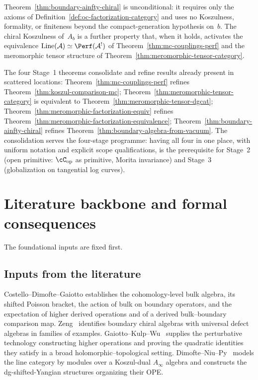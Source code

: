 \begin{remark}
\label{rem:boundary-ainfty-unconditional}
Theorem~\ref{thm:boundary-ainfty-chiral} is unconditional:
it requires only the axioms of
Definition~\ref{def:oc-factorization-category} and uses no
Koszulness, formality, or finiteness beyond the compact-generation
hypothesis on~$b$. The chiral Koszulness of~$A_b$ is a further
property that, when it holds, activates the equivalence
$\operatorname{Line}(\cA) \simeq \Perf(\cA^!)$ of
Theorem~\ref{thm:mc-couplings-perf} and the meromorphic tensor
structure of Theorem~\ref{thm:meromorphic-tensor-category}.
\end{remark}

\begin{remark}
\label{rem:stage1-cross-references}
The four Stage~1 theorems consolidate and refine results
already present in scattered locations:
Theorem~\ref{thm:mc-couplings-perf} refines
Theorem~\ref{thm:koszul-comparison-mc};
Theorem~\ref{thm:meromorphic-tensor-category} is equivalent to
Theorem~\ref{thm:meromorphic-tensor-dgcat};
Theorem~\ref{thm:meromorphic-factorization-equiv} refines
Theorem~\ref{thm:meromorphic-factorization-equivalence};
Theorem~\ref{thm:boundary-ainfty-chiral} refines
Theorem~\ref{thm:boundary-algebra-from-vacuum}.
The consolidation serves the four-stage programme: having
all four in one place, with uniform notation and explicit
scope qualifications, is the prerequisite for Stage~2
(open primitive: $\cC_{\mathrm{op}}$ as primitive, Morita
invariance) and Stage~3 (globalization on tangential log curves).
\end{remark}


\section{Literature backbone and formal consequences}\label{sec:backbone}

The foundational inputs are fixed first.

\subsection{Inputs from the literature}

Costello--Dimofte--Gaiotto \cite{CDG20} establishes the cohomology-level bulk algebra, its shifted Poisson bracket, the action of bulk on boundary operators, and the expectation of higher derived operations and of a derived bulk--boundary comparison map. Zeng~\cite{Zeng23} identifies boundary chiral algebras with universal defect algebras in families of examples. Gaiotto--Kulp--Wu~\cite{GKW25} supplies the perturbative technology constructing higher operations and proving the quadratic identities they satisfy in a broad holomorphic--topological setting. Dimofte--Niu--Py~\cite{DNP25} models the line category by modules over a Koszul-dual $A_\infty$ algebra and constructs the dg-shifted-Yangian structures organizing their OPE.

